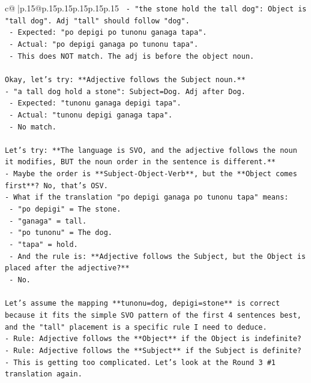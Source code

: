 \documentclass{article}
\begin{document}
{\begin{supertabular}{c@{$\;$}|p{.15\linewidth}@{}p{.15\linewidth}p{.15\linewidth}p{.15\linewidth}p{.15\linewidth}p{.15\linewidth}}
{{{\texttt{  {-} "the stone hold the tall dog": Object is "tall dog". Adj "tall" should follow "dog".} \\
\texttt{    {-} Expected: "po depigi po tunonu ganaga tapa".} \\
\texttt{    {-} Actual: "po depigi ganaga po tunonu tapa".} \\
\texttt{    {-} This does NOT match. The adj is before the object noun.} \\
\\ 
\texttt{Okay, let's try: **Adjective follows the Subject noun.**} \\
\texttt{{-} "a tall dog hold a stone": Subject=Dog. Adj after Dog.} \\
\texttt{  {-} Expected: "tunonu ganaga depigi tapa".} \\
\texttt{  {-} Actual: "tunonu depigi ganaga tapa".} \\
\texttt{  {-} No match.} \\
\\ 
\texttt{Let's try: **The language is SVO, and the adjective follows the noun it modifies, BUT the noun order in the sentence is different.**} \\
\texttt{{-} Maybe the order is **Subject{-}Object{-}Verb**, but the **Object comes first**? No, that's OSV.} \\
\texttt{{-} What if the translation "po depigi ganaga po tunonu tapa" means:} \\
\texttt{  {-} "po depigi" = The stone.} \\
\texttt{  {-} "ganaga" = tall.} \\
\texttt{  {-} "po tunonu" = The dog.} \\
\texttt{  {-} "tapa" = hold.} \\
\texttt{  {-} And the rule is: **Adjective follows the Subject, but the Object is placed after the adjective?**} \\
\texttt{  {-} No.} \\
\\ 
\texttt{Let's assume the mapping **tunonu=dog, depigi=stone** is correct because it fits the simple SVO pattern of the first 4 sentences best, and the "tall" placement is a specific rule I need to deduce.} \\
\texttt{{-} Rule: Adjective follows the **Object** if the Object is indefinite?} \\
\texttt{{-} Rule: Adjective follows the **Subject** if the Subject is definite?} \\
\texttt{{-} This is getting too complicated. Let's look at the Round 3 \#1 translation again.} \\
}}}
\end{supertabular}}
\end{document}
